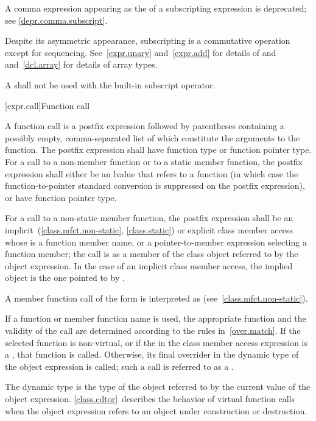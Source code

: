 \pnum
\begin{note}
A comma expression
appearing as the 
of a subscripting expression is deprecated;
see \ref{depr.comma.subscript}.
\end{note}

\pnum
\begin{note}
Despite its asymmetric appearance, subscripting is a commutative
operation except for sequencing.
See~\ref{expr.unary} and~\ref{expr.add} for details of \tcode{*} and
\tcode{+} and~\ref{dcl.array} for details of array types.
\end{note}

\pnum
A  shall not be used with the built-in subscript operator.

[expr.call]{Function call}

\pnum
{}%
%
%
A function call is a postfix expression followed by parentheses
containing a possibly empty, comma-separated list of
 which
constitute the arguments to the function. The postfix expression shall
have function type or function pointer type.
For a call to a non-member function or to a static member function,
the postfix expression shall either be an lvalue that refers to a
function (in which case the function-to-pointer standard
conversion is suppressed on the postfix expression),
or have function pointer type.

\pnum
For a call to a non-static member function,
the postfix expression shall be an
implicit~(\ref{class.mfct.non-static}, \ref{class.static}) or explicit
class member access whose  is a
function member name, or a pointer-to-member
expression selecting a function member; the call is as a member of
the class object referred to by the
object expression. In the case of an implicit class
member access, the implied object is the one pointed to by .
\begin{note}
A member function call of the form  is interpreted as
 (see~\ref{class.mfct.non-static}).
\end{note}

\pnum
If a function or member function name is used,
the appropriate function and the validity of the call are determined
according to the rules in~\ref{over.match}. If the selected
function is non-virtual, or if the  in the class
member access expression is a , that function is
called. Otherwise, its final overrider in the dynamic type
of the object expression is called; such a call is referred to as a
.
\begin{note}
The dynamic type is the type of the object referred to by the
current value of the object expression. \ref{class.cdtor}~describes the
behavior of virtual function calls when the object expression
refers to
an object under construction or destruction.
\end{note}

